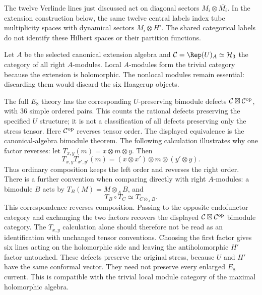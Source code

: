 The twelve Verlinde lines just discussed act on diagonal
sectors $M_i\otimes\overline{M_i}$. In the extension construction
below, the same twelve central labels index tube multiplicity
spaces with dynamical sectors $M_i\otimes\overline{H'}$.
The shared categorical labels do not identify these Hilbert
spaces or their partition functions.

Let $A$ be the selected canonical extension algebra and
$\mathcal C=\Rep(U)_A\simeq\mathcal H_3$ the category of all
right $A$-modules. Local $A$-modules form the trivial category
because the extension is holomorphic. The nonlocal modules remain
essential: discarding them would discard the six Haagerup objects.

The full $E_8$ theory has the corresponding $U$-preserving
bimodule defects
$\mathcal C\boxtimes\mathcal C^{\rm op}$, with $36$ simple
ordered pairs. This counts the rational defects preserving
the specified $U$ structure; it is not a classification of all
defects preserving only the stress tensor.
Here $\mathcal C^{\rm op}$ reverses tensor order.
The displayed equivalence is the canonical-algebra bimodule theorem.
The following calculation illustrates why one factor reverses:
let
$T_{x,y}(m)=x\otimes m\otimes y$. Then
\[
 T_{x,y}T_{x',y'}(m)
 =(x\otimes x')\otimes m\otimes(y'\otimes y).
\]
Thus ordinary composition keeps the left order and reverses the
right order. There is a further convention when comparing directly
with right $A$-modules: a bimodule $B$ acts by
$T_B(M)=M\otimes_A B$, and
\[
 T_B\circ T_C\simeq T_{C\otimes_A B}.
\]
This correspondence reverses composition. Passing to the opposite
endofunctor category and exchanging the two factors recovers the
displayed $\mathcal C\boxtimes\mathcal C^{\rm op}$ bimodule
category. The $T_{x,y}$ calculation alone should therefore not be
read as an identification with unchanged tensor conventions.
Choosing the first factor gives six lines acting
on the holomorphic side and leaving the antiholomorphic $H'$
factor untouched. These defects preserve the original stress,
because $U$ and $H'$ have the same conformal vector. They need
not preserve every enlarged $E_8$ current. This is compatible
with the trivial local module category of the maximal
holomorphic algebra.

